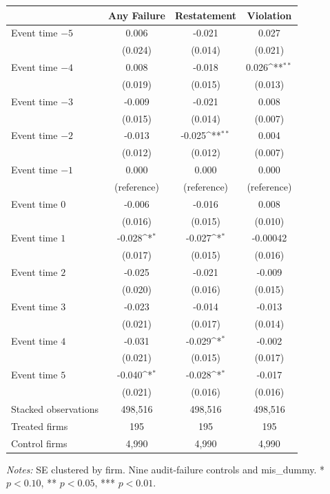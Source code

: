\documentclass[10pt]{article}
\newcommand{\sym}[1]{\textsuperscript{#1}}
\begin{document}
\begin{minipage}{19cm}\fontsize{10}{12}\selectfont\setlength{\tabcolsep}{4pt}\renewcommand{\arraystretch}{1.15}


\def\sym#1{\ifmmode^{#1}\else\(^{#1}\)\fi}
\centering
{}
\label{tab:big4-eventstudy-stacked}
\begin{threeparttable}
\begin{tabular}{l c c c }
\toprule
 & Any Failure & Restatement & Violation \\
\midrule
Event time $-5$ & 0.006 & -0.021 & 0.027 \\
 & (0.024) & (0.014) & (0.021) \\
Event time $-4$ & 0.008 & -0.018 & 0.026\sym{**} \\
 & (0.019) & (0.015) & (0.013) \\
Event time $-3$ & -0.009 & -0.021 & 0.008 \\
 & (0.015) & (0.014) & (0.007) \\
Event time $-2$ & -0.013 & -0.025\sym{**} & 0.004 \\
 & (0.012) & (0.012) & (0.007) \\
Event time $-1$ & 0.000 & 0.000 & 0.000 \\
 & (reference) & (reference) & (reference) \\
Event time $0$ & -0.006 & -0.016 & 0.008 \\
 & (0.016) & (0.015) & (0.010) \\
Event time $1$ & -0.028\sym{*} & -0.027\sym{*} & -0.00042 \\
 & (0.017) & (0.015) & (0.016) \\
Event time $2$ & -0.025 & -0.021 & -0.009 \\
 & (0.020) & (0.016) & (0.015) \\
Event time $3$ & -0.023 & -0.014 & -0.013 \\
 & (0.021) & (0.017) & (0.014) \\
Event time $4$ & -0.031 & -0.029\sym{*} & -0.002 \\
 & (0.021) & (0.015) & (0.017) \\
Event time $5$ & -0.040\sym{*} & -0.028\sym{*} & -0.017 \\
 & (0.021) & (0.016) & (0.016) \\
\midrule
Stacked observations & 498,516 & 498,516 & 498,516 \\
Treated firms & 195 & 195 & 195 \\
Control firms & 4,990 & 4,990 & 4,990 \\
\bottomrule
\end{tabular}
\begin{tablenotes}\fontsize{9}{11}\selectfont
\item \raggedright \fontsize{9}{11}\selectfont \textit{Notes:} SE clustered by firm. Nine audit-failure controls and mis\_dummy. * $p<0.10$, ** $p<0.05$, *** $p<0.01$.
\end{tablenotes}
\end{threeparttable}

\end{minipage}
\end{document}
